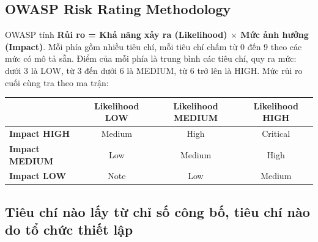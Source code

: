 \documentclass[11pt,a4paper]{article}
\begin{document}
\subsection{OWASP Risk Rating Methodology}

OWASP tính \textbf{Rủi ro = Khả năng xảy ra (Likelihood) $\times$ Mức ảnh hưởng (Impact)}. Mỗi phía gồm nhiều tiêu chí, mỗi tiêu chí chấm từ 0 đến 9 theo các mức có mô tả sẵn. Điểm của mỗi phía là trung bình các tiêu chí, quy ra mức: dưới 3 là LOW, từ 3 đến dưới 6 là MEDIUM, từ 6 trở lên là HIGH. Mức rủi ro cuối cùng tra theo ma trận:

\begin{center}
\small
\begin{tabular}{@{}lccc@{}}
\toprule
 & \textbf{Likelihood LOW} & \textbf{Likelihood MEDIUM} & \textbf{Likelihood HIGH} \\
\midrule
\textbf{Impact HIGH}   & Medium & High   & Critical \\
\textbf{Impact MEDIUM} & Low    & Medium & High \\
\textbf{Impact LOW}    & Note   & Low    & Medium \\
\bottomrule
\end{tabular}
\end{center}

\subsection{Tiêu chí nào lấy từ chỉ số công bố, tiêu chí nào do tổ chức thiết lập}
\end{document}
